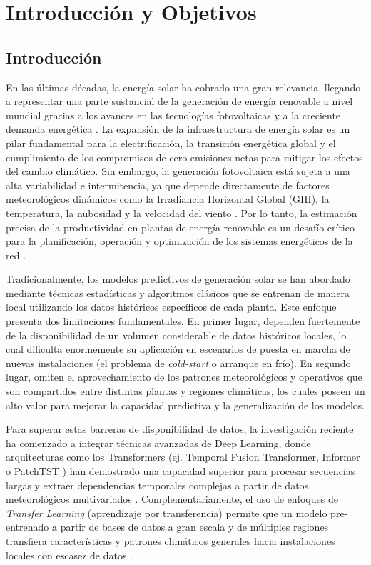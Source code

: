 \section{Introducción y Objetivos}

\subsection{Introducción}
En las últimas décadas, la energía solar ha cobrado una gran relevancia, llegando a representar una parte sustancial de la generación de energía renovable a nivel mundial gracias a los avances en las tecnologías fotovoltaicas y a la creciente demanda energética \cite{IEA2023}. La expansión de la infraestructura de energía solar es un pilar fundamental para la electrificación, la transición energética global y el cumplimiento de los compromisos de cero emisiones netas para mitigar los efectos del cambio climático. Sin embargo, la generación fotovoltaica está sujeta a una alta variabilidad e intermitencia, ya que depende directamente de factores meteorológicos dinámicos como la Irradiancia Horizontal Global (GHI), la temperatura, la nubosidad y la velocidad del viento \cite{Antonanzas2016}. Por lo tanto, la estimación precisa de la productividad en plantas de energía renovable es un desafío crítico para la planificación, operación y optimización de los sistemas energéticos de la red \cite{cen2025}.

Tradicionalmente, los modelos predictivos de generación solar se han abordado mediante técnicas estadísticas y algoritmos clásicos que se entrenan de manera local utilizando los datos históricos específicos de cada planta. Este enfoque presenta dos limitaciones fundamentales. En primer lugar, dependen fuertemente de la disponibilidad de un volumen considerable de datos históricos locales, lo cual dificulta enormemente su aplicación en escenarios de puesta en marcha de nuevas instalaciones (el problema de \textit{cold-start} o arranque en frío). En segundo lugar, omiten el aprovechamiento de los patrones meteorológicos y operativos que son compartidos entre distintas plantas y regiones climáticas, los cuales poseen un alto valor para mejorar la capacidad predictiva y la generalización de los modelos.

Para superar estas barreras de disponibilidad de datos, la investigación reciente ha comenzado a integrar técnicas avanzadas de Deep Learning, donde arquitecturas como los Transformers (ej. Temporal Fusion Transformer, Informer \cite{Zhou2021} o PatchTST \cite{Nie2022}) han demostrado una capacidad superior para procesar secuencias largas y extraer dependencias temporales complejas a partir de datos meteorológicos multivariados \cite{Arslan2025}. Complementariamente, el uso de enfoques de \textit{Transfer Learning} (aprendizaje por transferencia) permite que un modelo pre-entrenado a partir de bases de datos a gran escala y de múltiples regiones transfiera características y patrones climáticos generales hacia instalaciones locales con escasez de datos \cite{Bak2025}.

